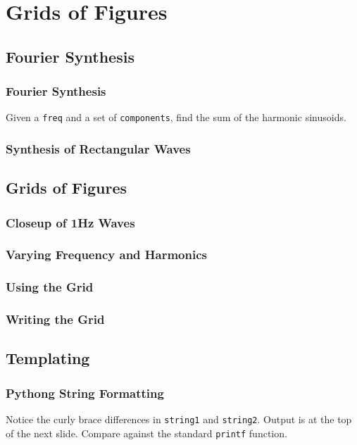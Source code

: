 
\section{Grids of Figures}
\begin{frame}
\tableofcontents[currentsection]
\end{frame}

\subsection{Fourier Synthesis}
\begin{frame}[fragile]
\frametitle{Fourier Synthesis}
Given a \verb|freq| and a set of
\verb|components|, find the sum of
the harmonic sinusoids.
\end{frame}

\begin{frame}
\frametitle{Synthesis of Rectangular Waves}
\end{frame}

\subsection{Grids of Figures}
\begin{frame}
\frametitle{Closeup of 1Hz Waves}
\vspace{-1em}

\end{frame}

\begin{frame}
\frametitle{Varying Frequency and Harmonics}

\end{frame}

\begin{frame}
\frametitle{Using the Grid}
\end{frame}

\begin{frame}
\frametitle{Writing the Grid}
\end{frame}

\subsection{Templating}
\begin{frame}[fragile]
\frametitle{Pythong String Formatting}
Notice the curly brace differences in 
\verb|string1| and
\verb|string2|. Output is at the top
of the next slide. 
Compare against the standard 
\verb|printf| function.
\end{frame}

